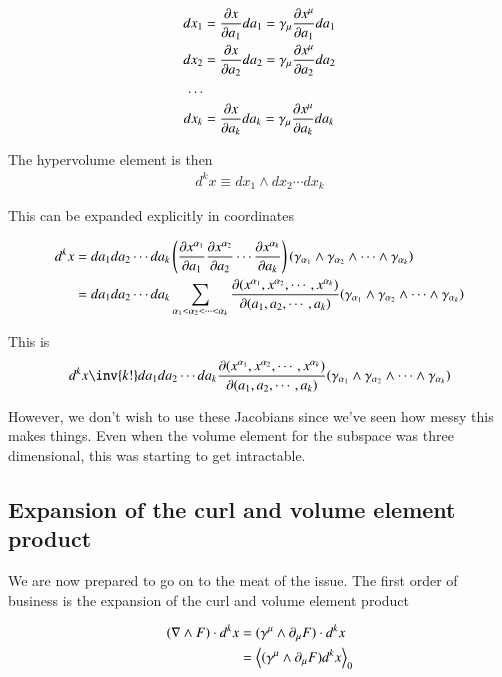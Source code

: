 \begin{align*}
dx_1 & = \PD{a_1}{x} da_1 = \gamma_\mu \PD{a_1}{x^\mu} da_1 \\
dx_2 & = \PD{a_2}{x} da_2 = \gamma_\mu \PD{a_2}{x^\mu} da_2 \\
\hdots \\
dx_k & = \PD{a_k}{x} da_k = \gamma_\mu \PD{a_k}{x^\mu} da_k \\
\end{align*}

The hypervolume element is then
\begin{align}
d^k x \equiv dx_1 \wedge dx_2 \cdots dx_k
\end{align}

This can be expanded explicitly in coordinates

\begin{align*}
d^k x 
&= da_1 da_2 \cdots da_k 
\left(
\PD{a_1}{x^{\alpha_1}} 
\PD{a_2}{x^{\alpha_2}} 
\cdots
\PD{a_k}{x^{\alpha_k}} 
\right)
( \gamma_{\alpha_1} \wedge \gamma_{\alpha_2} \wedge \cdots \wedge \gamma_{\alpha_k} ) \\
&= 
da_1 da_2 \cdots da_k 
\sum_{\alpha_1 < \alpha_2 < \cdots < \alpha_k}
\PD{(a_1, a_2, \cdots, a_k)}{(x^{\alpha_1}, x^{\alpha_2}, \cdots, x^{\alpha_k})}
( \gamma_{\alpha_1} \wedge \gamma_{\alpha_2} \wedge \cdots \wedge \gamma_{\alpha_k} ) \\
\end{align*}

This is
\begin{align}\label{eqn:stokesNoTensor:jacobian}
d^k x 
\inv{k!}
da_1 da_2 \cdots da_k
\PD{(a_1, a_2, \cdots, a_k)}{(x^{\alpha_1}, x^{\alpha_2}, \cdots, x^{\alpha_k})}
( \gamma_{\alpha_1} \wedge \gamma_{\alpha_2} \wedge \cdots \wedge \gamma_{\alpha_k} ) 
\end{align}

However, we don't wish to use these Jacobians since we've seen how messy this makes things.  Even when the volume element for the subspace was three dimensional, this was starting to get intractable.

\subsection{Expansion of the curl and volume element product}

We are now prepared to go on to the meat of the issue.  The first order of business is the expansion of the curl and volume element product

\begin{align*}
( \grad \wedge F ) \cdot d^k x
&=
( \gamma^\mu \wedge \partial_\mu F ) \cdot d^k x \\
&=
\gpgradezero{ ( \gamma^\mu \wedge \partial_\mu F ) d^k x } \\
\end{align*}


